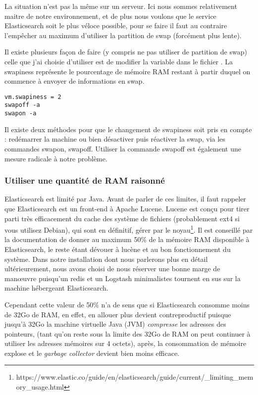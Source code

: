 La situation n'est pas la même sur un serveur. Ici nous sommes relativement maitre
de notre environnement, et de plus nous voulons que le service Elasticsearch soit 
le plus véloce possible, pour se faire il faut au contraire l'empêcher au maximum 
d'utiliser la partition de swap (forcément plus lente).

Il existe plusieurs façon de faire (y compris ne pas utiliser de partition de swap)
celle que j'ai choisie d'utiliser est de modifier la variable 
dans le fichier . La swapiness représente le pourcentage
de mémoire RAM restant à partir duquel on commence à envoyer de informations en
swap.

\begin{lstlisting}[style=code,label={lst:configswapiness},caption={Configuration swapiness}]
vm.swapiness = 2
swapoff -a
swapon -a
\end{lstlisting}
Il existe deux méthodes pour que le changement de swapiness soit pris en compte :
redémarrer la machine ou bien désactiver puis réactiver la swap, via les commandes
swapon, swapoff. Utiliser la commande swapoff est également une mesure radicale à 
notre problème.

\subsubsection{Utiliser une quantité de RAM raisonné}
Elasticsearch est limité par Java. Avant de parler de ces limites, il faut rappeler 
que Elasticsearch est un front-end à Apache Lucene. Lucene est conçu pour tirer 
parti très efficacement du cache des système de fichiers (probablement ext4 si 
vous utilisez Debian), qui sont en définitif, gérer par le 
noyau\footnote{https://www.elastic.co/guide/en/elasticsearch/guide/current/\_limiting\_memory\_usage.html}.
Il est conseillé par la documentation de donner au maximum 50\% de la mémoire RAM
disponible à Elasticsearch, le reste étant dévouer à lucène et au bon fonctionnement
du système.
Dans notre installation dont nous parlerons plus en détail ultérieurement, nous 
avons choisi de nous réserver une bonne marge de manœuvre puisqu'un redis et un Logstash
minimalistes tournent en sus sur la machine hébergeant Elasticsearch.

Cependant cette valeur de 50\% n'a de sens que si Elasticsearch consomme moins de 
32Go de RAM, en effet, en allouer plus devient contreproductif puisque jusqu'à 32Go
la machine virtuelle Java (JVM) \textit{compresse} les adresses des pointeurs, 
(tant qu'on reste sous la limite des 32Go de RAM on peut continuer à utiliser les 
adresses mémoires sur 4 octets), après, la consommation de mémoire explose et le
\textit{garbage collector} devient bien moins efficace.

